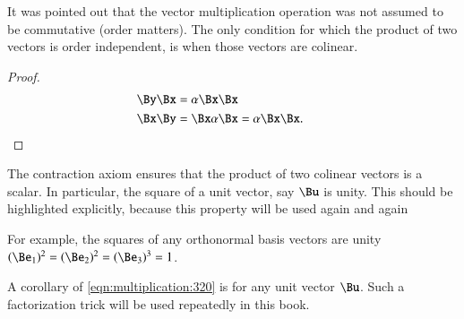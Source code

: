 %
%
It was pointed out that the vector multiplication operation was not assumed to be commutative (order matters).
The only condition for which the product of two vectors is order independent, is when those vectors are colinear.


\begin{proof}
\begin{align*}
\By \Bx &= \alpha \Bx \Bx \\
\Bx \By &= \Bx \alpha \Bx = \alpha \Bx \Bx.
&& \qedhere
\end{align*}
\end{proof}

The contraction axiom ensures that the product of two colinear vectors is a scalar.
In particular, the square of a unit vector, say \( \Bu \) is unity.
This should be highlighted explicitly, because this property will be used again and again

For example, the squares of any orthonormal basis vectors are unity \( (\Be_1)^2 = (\Be_2)^2 = (\Be_3)^3 = 1 \).

A corollary of
\cref{eqn:multiplication:320} is
for any unit vector \( \Bu \).
Such a factorization trick will be used repeatedly in this book.
